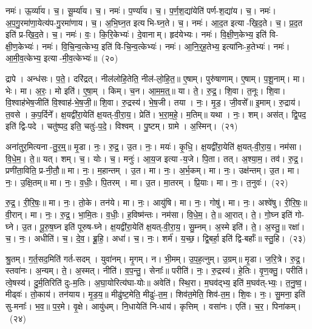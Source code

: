 नमः॑। ऊ॒र्व्या॑य। च॒। सू॒र्म्या॑य। च॒। 
नमः॑। प॒र्ण्या॑य। च॒। प॒र्ण॒श॒द्या॑येति॑ पर्ण-श॒द्या॑य। च॒। 
नमः॑। अ॒प॒गु॒रमा॑णा॒येत्य॑प-गु॒रमा॑णाय। च॒। अ॒भि॒घ्न॒त इत्यभि-घ्न॒ते। च॒। 
नमः॑। \mbox{आ॒\akhkhi{}द॒त} इत्या-खि॒द॒ते। च॒। \mbox{प्र॒\akhkhi{}द॒त} इति॑ प्र-खि॒द॒ते। च॒। 
नमः॑। वः॒। कि॒रि॒केभ्यः॑। दे॒वानाम्। हृद॑येभ्यः। नमः॑। 
वि॒क्षी॒ण॒केभ्य॒ इति॑ वि-क्षी॒ण॒केभ्यः॑। नमः॑। वि॒चि॒न्व॒त्केभ्य॒ इति॑ वि-चि॒न्व॒त्केभ्यः॑। नमः॑। 
आ॒नि॒र्॒‌ह॒तेभ्य॒ इत्या॑निः-ह॒तेभ्यः॑। नमः॑। आ॒मी॒व॒त्केभ्य॒ इत्या-मी॒व॒त्केभ्यः॑॥~(२०)


द्रापे। अन्ध॑सः। प॒ते॒। दरि॑द्रत्। नील॑लोहि॒तेति॒ नील॑-लो॒हि॒त॒॥ 
ए॒षाम्। पुरु॑षाणाम्। ए॒षाम्। प॒शू॒नाम्। मा। भेः। मा। अ॒रः॒। मो इति॑। ए॒षा॒म्। किम्। च॒न। आ॒म॒म॒त्॒॥ 
या। ते॒। रु॒द्र॒। शि॒वा। त॒नूः। शि॒वा। वि॒श्वाह॑भेष॒जीति॑ वि॒श्वाह॑-भे॒ष॒जी॒॥ 
शि॒वा। रु॒द्रस्य॑। भे॒ष॒जी। तया। नः॒। मृ॒ड॒। जी॒वसे᳚॥ 
इ॒माम्। रु॒द्राय॑। त॒वसे। क॒प॒र्दिने᳚। क्ष॒यद्वी॑रा॒येति॑ क्ष॒यत्-वी॒रा॒य॒। प्रेति॑। भ॒रा॒म॒हे॒। म॒तिम्॥ 
यथा। नः॒। शम्। अस॑त्। द्वि॒पद॒ इति॑ द्वि-पदे। चतु॑ष्पद॒ इति॒ चतुः॑-प॒दे॒। विश्वम्। पु॒ष्टम्। ग्रामे। अ॒स्मिन्।~(२१)


अना॑तुर॒मित्यना-तु॒र॒म्॒॥ 
मृ॒डा। नः॒। रु॒द्र॒। उ॒त। नः॒। मयः॑। कृ॒धि॒। क्ष॒यद्वी॑रा॒येति॑ क्ष॒यत्-वी॒रा॒य॒। नम॑सा। वि॒धे॒म॒। ते॒॥ 
यत्। शम्। च॒। योः। च॒। मनुः॑। आ॒य॒ज इत्या-य॒जे। पि॒ता। तत्। अ॒श्या॒म॒। तव॑। रु॒द्र॒। प्रणी॑ता॒विति॒ प्र-नी॒तौ॒॥ 
मा। नः॒। म॒हान्तम्। उ॒त। मा। नः॒। अ॒र्भ॒कम्। मा। नः॒। उक्ष॑न्तम्। उ॒त। मा। नः॒। उ॒क्षि॒तम्॥ 
मा। नः॒। व॒धीः॒। पि॒तरम्। मा। उ॒त। मा॒तरम्। प्रि॒याः। मा। नः॒। त॒नुवः॑।~(२२)


रु॒द्र॒। री॒रि॒षः॒॥ 
मा। नः॒। तो॒के। तन॑ये। मा। नः॒। आयु॑षि। मा। नः॒। गोषु॑। मा। नः॒। अश्वे॑षु। री॒रि॒षः॒॥ 
वी॒रान्। मा। नः॒। रु॒द्र॒। भा॒मि॒तः। व॒धीः॒। ह॒विष्म॑न्तः। नम॑सा। वि॒धे॒म॒। ते॒॥ 
आ॒रात्। ते॒। गो॒घ्न इति॑ गो-घ्ने। उ॒त। पू॒रु॒ष॒घ्न इति॑ पूरुष-घ्ने। क्ष॒यद्वी॑रा॒येति॑ क्ष॒यत्-वी॒रा॒य॒। सु॒म्नम्। अ॒स्मे इति॑। ते॒। अ॒स्तु॒॥ 
रक्षा॑। च॒। नः॒। अधीति॑। च॒। दे॒व॒। ब्रू॒हि॒। अधा॑। च॒। नः॒। शर्म॑। य॒च्छ॒। द्वि॒बर्हा॒ इति॑ द्वि-बर्हाः᳚॥ 
स्तु॒हि।~(२३)


श्रु॒तम्। ग॒र्त॒सद॒मिति॑ गर्त-सदम्। युवा॑नम्। मृ॒गम्। न। भी॒मम्। उ॒प॒ह॒त्नुम्। उ॒ग्रम्॥ 
मृ॒डा। ज॒रि॒त्रे। रु॒द्र॒। स्तवा॑नः। अ॒न्यम्। ते॒। अ॒स्मत्। नीति॑। व॒प॒न्तु॒। सेनाः᳚॥ 
परीति॑। नः॒। रु॒द्रस्य॑। हे॒तिः। वृ॒ण॒क्तु॒। परीति॑। त्वे॒षस्य॑। दु॒र्म॒तिरिति॑ दुः-म॒तिः। अ॒घा॒योरित्य॑घा-योः॥ 
अवेति॑। स्थि॒रा। म॒घव॑द्भ्य॒ इति॑ म॒घव॑त्-भ्यः॒। त॒नु॒ष्व॒। मीढ्वः॑। तो॒काय॑। तन॑याय। मृ॒ड॒य॒॥ 
मीढु॑ष्ट॒मेति॒ मीढुः॑-त॒म॒। शिव॑त॒मेति॒ शिव॑-त॒म॒। शि॒वः। नः॒। सु॒मना॒ इति॑ सु-मनाः᳚। भ॒व॒॥ 
प॒र॒मे। वृ॒क्षे। आयु॑धम्। नि॒धायेति॑ नि-धाय॑। कृत्तिम्। वसा॑नः। एति॑। च॒र॒। पिना॑कम्।~(२४)


